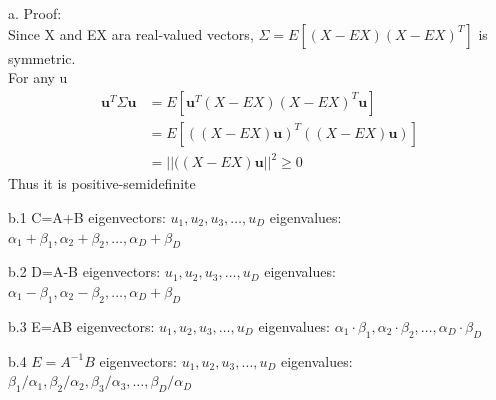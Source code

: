 \documentclass[12pt]{article}
\newenvironment{problem}[2][Problem]{\begin{trivlist}
\item[\hskip \labelsep {\bfseries #1}\hskip \labelsep {\bfseries #2}]}{\end{trivlist}}
\begin{document}
\begin{problem}{3. Linear Algebra}
\item {a.} {Proof:\\}
	Since X and EX ara real-valued vectors, $\Sigma = E[(X-EX)(X-EX)^T]$ is symmetric. \\
	For any u 
	\begin{align*}
	  \textbf{u}^T\Sigma \textbf{u} & = E[\textbf{u}^T(X-EX)(X-EX)^T\textbf{u}] \\
	    & = E[((X-EX)\textbf{u})^T((X-EX)\textbf{u})] \\
		& = ||((X-EX)\textbf{u}||^2 \geq 0
    \end{align*}
	Thus it is positive-semidefinite
\item {b.1} {C=A+B} eigenvectors: $u_1, u_2, u_3, \dots, u_D$ eigenvalues: $\alpha_1+\beta_1, \alpha_2+\beta_2, \dots, \alpha_D+\beta_D$
\item {b.2} {D=A-B} eigenvectors: $u_1, u_2, u_3, \dots, u_D$ eigenvalues: $\alpha_1-\beta_1, \alpha_2-\beta_2, \dots, \alpha_D+\beta_D$
\item {b.3} {E=AB} eigenvectors: $u_1, u_2, u_3, \dots, u_D$ eigenvalues: $\alpha_1\cdot\beta_1, \alpha_2\cdot\beta_2, \dots, \alpha_D\cdot\beta_D$
\item {b.4} {$E=A^{-1}B$} eigenvectors: $u_1, u_2, u_3, \dots, u_D$ eigenvalues: $\beta_1/\alpha_1, \beta_2/\alpha_2, \beta_3/\alpha_3, \dots, \beta_D/\alpha_D$
\end{problem}
\end{document}
